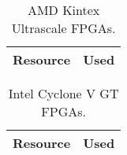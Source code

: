 \ifdefined\FPGA

\ifdefined\XILINX
\begin{table}[H]
\centering
\begin{tabular}{|l|r|}
\hline
\rowcolor{iob-green}
\textbf{Resource}  & \textbf{Used} \\
\hline
\hline
 
\end{tabular}
\caption{AMD Kintex Ultrascale FPGAs.}
\label{tab:fpga_amd}
\end{table}
\fi


\ifdefined\INTEL
\begin{table}[H]
\centering
\begin{tabular}{|l|r|}
\hline
\rowcolor{iob-green}
\textbf{Resource}  & \textbf{Used} \\
\hline
\hline
 
\end{tabular}
\caption{Intel Cyclone V GT FPGAs.}
\label{tab:fpga_intel}
\end{table}
\fi

\fi
